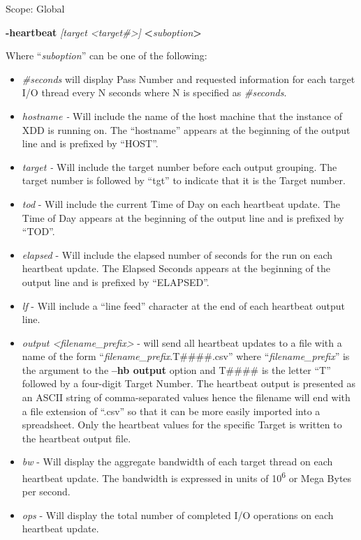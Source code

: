 Scope: Global

\textbf{-heartbeat} \emph{{[}target \textless target\#\textgreater{]}} \textbf{\textless{}}\emph{suboption}\textbf{\textgreater{}}

Where ``\emph{suboption}'' can be one of the following:

\begin{itemize}
\item
  \emph{\#seconds} will display Pass Number and requested information for each target I/O thread every N seconds where N is specified as \emph{\#seconds}.
\item
  \emph{hostname -} Will include the name of the host machine that the instance of XDD is running on. The ``hostname'' appears at the beginning of the output line and is prefixed by ``HOST''.
\item
  \emph{target -} Will include the target number before each output grouping. The target number is followed by ``tgt'' to indicate that it is the Target number.
\item
  \emph{tod} - Will include the current Time of Day on each heartbeat update. The Time of Day appears at the beginning of the output line and is prefixed by ``TOD''.
\item
  \emph{elapsed} - Will include the elapsed number of seconds for the run on each heartbeat update. The Elapsed Seconds appears at the beginning of the output line and is prefixed by ``ELAPSED''.
\item
  \emph{lf} - Will include a ``line feed'' character at the end of each heartbeat output line.
\item
  \emph{output \textless filename\_prefix\textgreater{}} - will send all heartbeat updates to a file with a name of the form ``\emph{filename\_prefix}.T\#\#\#\#.csv'' where ``\emph{filename\_prefix}'' is the argument to the \textbf{--hb output} option and T\#\#\#\# is the letter ``T'' followed by a four-digit Target Number. The heartbeat output is presented as an ASCII string of comma-separated values hence the filename will end with a file extension of ``.csv'' so that it can be more easily imported into a spreadsheet. Only the heartbeat values for the specific Target is written to the heartbeat output file.
\item
  \emph{bw} - Will display the aggregate bandwidth of each target thread on each heartbeat update. The bandwidth is expressed in units of 10\textsuperscript{6} or Mega Bytes per second.
\item
  \emph{ops} - Will display the total number of completed I/O operations on each heartbeat update.

\end{itemize}
